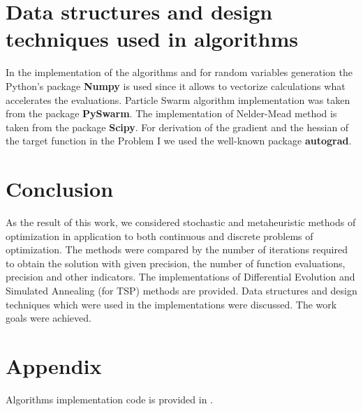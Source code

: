 \documentclass[12pt, bachelor, substylefile = algo_title.rtx]{disser}
\theoremstyle{definition}
\begin{document}
\section{Data structures and design techniques used in algorithms}


In the implementation of the algorithms and for random variables generation the Python's package \textbf{Numpy} is used since it allows to vectorize calculations what accelerates the evaluations. Particle Swarm algorithm implementation was taken from the package \textbf{PySwarm}. The implementation of Nelder-Mead method is taken from the package \textbf{Scipy}. For derivation of the gradient and the hessian of the target function in the Problem I we used the well-known package \textbf{autograd}.


\section{Conclusion}
As the result of this work, we considered stochastic and metaheuristic methods of optimization in application to both continuous and discrete problems of optimization. The methods were compared by the number of iterations required to obtain the solution with given precision, the number of function evaluations, precision and other indicators. The implementations of Differential Evolution and Simulated Annealing (for TSP) methods are provided. Data structures and design techniques which were used in the implementations were discussed. The work goals were achieved.

\section{Appendix}
Algorithms implementation code is provided in \cite{repogithub}.

\nocite{Deisenroth2020}

{\small }

\end{document}
